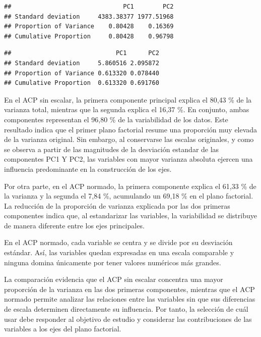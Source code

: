 \documentclass[
]{article}
\newenvironment{Shaded}{\begin{snugshade}}{\end{snugshade}}
\newcommand{\DecValTok}[1]{\textcolor[rgb]{0.00,0.00,0.81}{#1}}
\newcommand{\FunctionTok}[1]{\textcolor[rgb]{0.13,0.29,0.53}{\textbf{#1}}}
\newcommand{\NormalTok}[1]{#1}
\newcommand{\SpecialCharTok}[1]{\textcolor[rgb]{0.81,0.36,0.00}{\textbf{#1}}}
\begin{document}
\begin{verbatim}
##                               PC1        PC2
## Standard deviation     4383.38377 1977.51968
## Proportion of Variance    0.80428    0.16369
## Cumulative Proportion     0.80428    0.96798
\end{verbatim}

\begin{Shaded}
\end{Shaded}

\begin{verbatim}
##                             PC1      PC2
## Standard deviation     5.860516 2.095872
## Proportion of Variance 0.613320 0.078440
## Cumulative Proportion  0.613320 0.691760
\end{verbatim}

En el ACP sin escalar, la primera componente principal explica el 80,43
\% de la varianza total, mientras que la segunda explica el 16,37 \%. En
conjunto, ambas componentes representan el 96,80 \% de la variabilidad
de los datos. Este resultado indica que el primer plano factorial resume
una proporción muy elevada de la varianza original. Sin embargo, al
conservarse las escalas originales, y como se observa a partir de las
magnitudes de la desviación estandar de las componentes PC1 Y PC2, las
variables con mayor varianza absoluta ejercen una influencia
predominante en la construcción de los ejes.

Por otra parte, en el ACP normado, la primera componente explica el
61,33 \% de la varianza y la segunda el 7,84 \%, acumulando un 69,18 \%
en el plano factorial. La reducción de la proporción de varianza
explicada por las dos primeras componentes indica que, al estandarizar
las variables, la variabilidad se distribuye de manera diferente entre
los ejes principales.

En el ACP normado, cada variable se centra y se divide por su desviación
estándar. Así, las variables quedan expresadas en una escala comparable
y ninguna domina únicamente por tener valores numéricos más grandes.

La comparación evidencia que el ACP sin escalar concentra una mayor
proporción de la varianza en las dos primeras componentes, mientras que
el ACP normado permite analizar las relaciones entre las variables sin
que sus diferencias de escala determinen directamente su influencia. Por
tanto, la selección de cuál usar debe responder al objetivo de estudio y
considerar las contribuciones de las variables a los ejes del plano
factorial.
\end{document}
